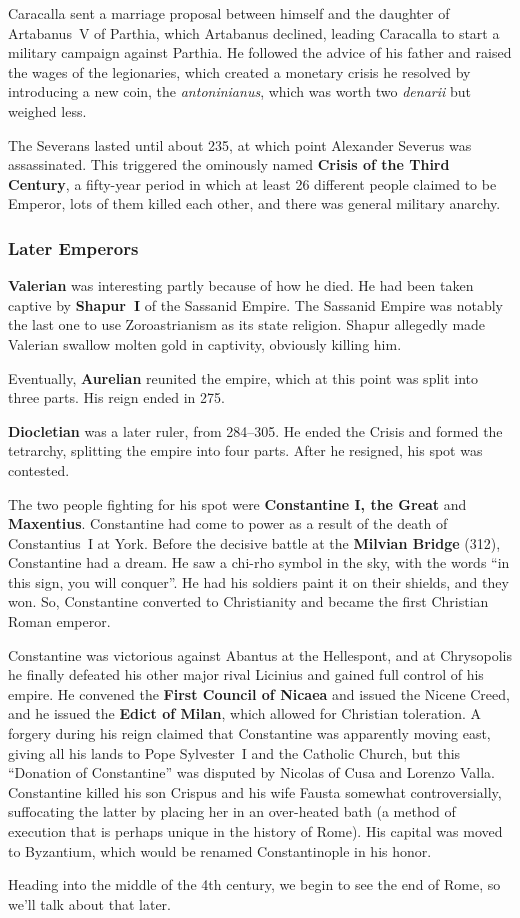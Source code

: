 Caracalla sent a marriage proposal between himself and the daughter of Artabanus~V of Parthia,
which Artabanus declined, leading Caracalla to start a military campaign against Parthia.
He followed the advice of his father and raised the wages of the legionaries,
which created a monetary crisis he resolved by introducing a new coin,
the \textit{antoninianus}, which was worth two \textit{denarii} but weighed less.

The Severans lasted until about 235,
at which point Alexander Severus was assassinated.
This triggered the ominously named \textbf{Crisis of the Third Century},
a fifty-year period in which at least 26 different people claimed to be Emperor,
lots of them killed each other, and there was general military anarchy.

\subsubsection*{Later Emperors}

\textbf{Valerian} was interesting partly because of how he died.
He had been taken captive by \textbf{Shapur~I} of the Sassanid Empire.
The Sassanid Empire was notably the last one to use Zoroastrianism as its state religion.
Shapur allegedly made Valerian swallow molten gold in captivity, obviously killing him.

Eventually, \textbf{Aurelian} reunited the empire, which at this point was split into three parts.
His reign ended in 275.

\textbf{Diocletian} was a later ruler, from 284--305.
He ended the Crisis and formed the tetrarchy, splitting the empire into four parts.
After he resigned, his spot was contested.

The two people fighting for his spot were \textbf{Constantine I, the Great} and \textbf{Maxentius}.
Constantine had come to power as a result of the death of Constantius~I at York.
Before the decisive battle at the \textbf{Milvian Bridge} (312), Constantine had a dream.
He saw a chi-rho symbol in the sky, with the words ``in this sign, you will conquer''.
He had his soldiers paint it on their shields, and they won.
So, Constantine converted to Christianity and became the first Christian Roman emperor.

Constantine was victorious against Abantus at the Hellespont,
and at Chrysopolis he finally defeated his other major rival Licinius
and gained full control of his empire.
He convened the \textbf{First Council of Nicaea} and issued the Nicene Creed,
and he issued the \textbf{Edict of Milan}, which allowed for Christian toleration.
A forgery during his reign claimed that Constantine was apparently moving east,
giving all his lands to Pope Sylvester~I and the Catholic Church,
but this ``Donation of Constantine'' was disputed by Nicolas of Cusa and Lorenzo Valla.
Constantine killed his son Crispus and his wife Fausta somewhat controversially,
suffocating the latter by placing her in an over-heated bath
(a method of execution that is perhaps unique in the history of Rome).
His capital was moved to Byzantium, which would be renamed Constantinople in his honor.

Heading into the middle of the 4th century, we begin to see the end of Rome,
so we'll talk about that later.
